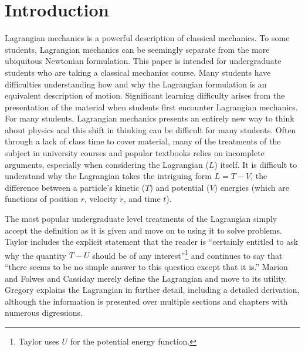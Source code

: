 \documentclass[prb,preprint]{revtex4-1}
\begin{document}
\maketitle



\section{Introduction}\label{introduction}

Lagrangian mechanics is a powerful description of classical mechanics. To some students, Lagrangian mechanics can be seemingly separate from the more ubiquitous Newtonian formulation. This paper is intended for undergraduate students who are taking a classical mechanics course. Many students have difficulties understanding how and why the Lagrangian formulation is an equivalent description of motion. Significant learning difficulty arises from the presentation of the material when students first encounter Lagrangian mechanics. For many students, Lagrangian mechanics presents an entirely new way to think about physics and this shift in thinking can be difficult for many students. Often through a lack of class time to cover material, many of the treatments of the subject in university courses and popular textbooks relies on incomplete arguments, especially when considering the Lagrangian ($L$) itself. It is difficult to understand why the Lagrangian takes the intriguing form $L=T-V$, the difference between a particle's kinetic ($T$) and potential ($V$) energies (which are functions of position $r$, velocity $\dot{r}$, and time $t$). 

The most popular undergraduate level treatments of the Lagrangian simply accept the definition as it is given and move on to using it to solve problems. Taylor\cite[p.~238]{taylor2005classical} includes the explicit statement that the reader is ``certainly entitled to ask why the quantity $T-U$ should be of any interest''\footnote{Taylor uses $U$ for the potential energy function.} and continues to say that ``there seems to be no simple answer to this question except that it is.'' Marion \cite[p.~198-199]{marion1970classical} and Folwes and Cassiday \cite[p.~393]{fowles1999analytical} merely define the Lagrangian and move to its utility. Gregory\cite[p.~348]{gregory2006classical} explains the Lagrangian in further detail, including a detailed derivation, although the information is presented over multiple sections and chapters with numerous digressions.
\end{document}
